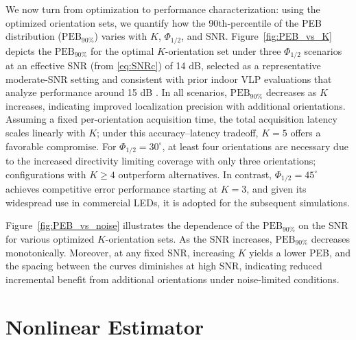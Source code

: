 \documentclass[journal]{IEEEtran}
\begin{document}
We now turn from optimization to performance characterization: using the optimized orientation sets, we quantify how the 90th‐percentile of the PEB distribution (\(\mathrm{PEB}_{90\%}\)) varies with \(K\), \(\Phi_{1/2}\), and SNR. Figure~\ref{fig:PEB_vs_K} depicts the \(\mathrm{PEB}_{90\%}\) for the optimal \(K\)-orientation set under three \(\Phi_{1/2}\) scenarios at an effective SNR (from \eqref{eq:SNRc}) of 14 dB, selected as a representative moderate-SNR setting and consistent with prior indoor VLP evaluations that analyze performance around 15 dB \cite{Shen2022}. In all scenarios, \(\mathrm{PEB}_{90\%}\) decreases as \(K\) increases, indicating improved localization precision with additional orientations. Assuming a fixed per-orientation acquisition time, the total acquisition latency scales linearly with \(K\); under this accuracy–latency tradeoff, \(K=5\) offers a favorable compromise. For \(\Phi_{1/2}=30^\circ\), at least four orientations are necessary due to the increased directivity limiting coverage with only three orientations; configurations with \(K\ge4\) outperform alternatives.  In contrast, \(\Phi_{1/2}=45^\circ\) achieves competitive error performance starting at \(K=3\), and given its widespread use in commercial LEDs, it is adopted for the subsequent simulations.

Figure~\ref{fig:PEB_vs_noise} illustrates the dependence of the \(\mathrm{PEB}_{90\%}\) on the SNR for various optimized \(K\)-orientation sets.  As the SNR increases, \(\mathrm{PEB}_{90\%}\) decreases monotonically.  Moreover, at any fixed SNR, increasing \(K\) yields a lower PEB, and the spacing between the curves diminishes at high SNR, indicating reduced incremental benefit from additional orientations under noise-limited conditions.


\section{Nonlinear Estimator}
\label{sec:NoLineal}
\end{document}
